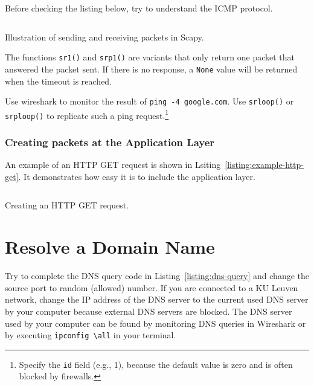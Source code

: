 \documentclass[11pt,a4paper]{article}
\begin{document}
 \begin{info}
     Before checking the listing below, try to understand the ICMP protocol.
 \end{info}

\begin{listing}[h]
\inputminted{python}{../code_students/example_sr.py}
\caption{Illustration of sending and receiving packets in Scapy.}%
\label{listing:example-sr}
\end{listing}

 The functions \texttt{sr1()}  and \texttt{srp1()} are variants that only return one packet that answered the packet sent. If there is no response, a \texttt{None} value will be returned when the timeout is reached. 
 
 \begin{question}
     Use wireshark to monitor the result of \texttt{ping -4 google.com}.
     Use \texttt{srloop()} or \texttt{srploop()} to replicate such a ping request.\footnote{Specify the \texttt{id} field (e.g., 1), because the default value is zero and is often blocked by firewalls. }
 \end{question}
 
\subsubsection{Creating packets at the Application Layer}
An example of an HTTP GET request is shown in Lsiting~\ref{listing:example-http-get}. It demonstrates how easy it is to include the application layer. 

\begin{listing}[h]
\inputminted{python}{../code_students/example-http-get.py}
\caption{Creating an HTTP GET request.}%
\label{listing:example-http-get}
\end{listing}



\FloatBarrier
\section{Resolve a Domain Name}
\begin{question}
    Try to complete the DNS query code in Listing~\ref{listing:dns-query} and change the source port to random (allowed) number.
    If you are connected to a KU Leuven network, change the IP address of the DNS server to the current used DNS server by your computer because external DNS servers are blocked. The DNS server used by your computer can be found by monitoring DNS queries in Wireshark or by executing \texttt{ipconfig \textbackslash all} in your terminal.  
\end{question}
\end{document}
